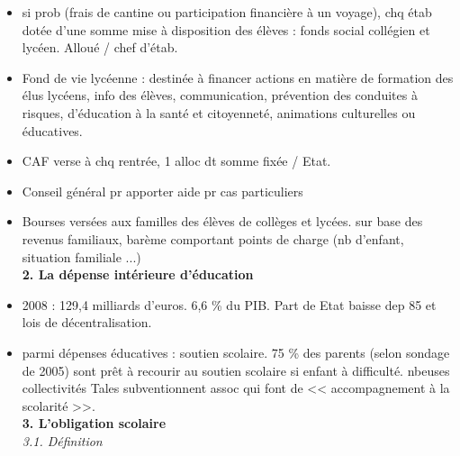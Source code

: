 \documentclass[12pt]{report}
\begin{document}
\begin{itemize}
\vspace{0.5cm}

\item si prob (frais de cantine ou participation financière à un voyage), chq étab dotée d'une somme mise à disposition des élèves : fonds social collégien et lycéen. Alloué /  chef d'étab.\\

\item Fond de vie lycéenne : destinée à financer actions en matière de formation des élus lycéens, info des élèves, communication, prévention des conduites à risques, d'éducation à la santé et citoyenneté, animations culturelles ou éducatives.\\

\item CAF verse à chq rentrée, 1 alloc dt somme fixée / Etat. \\

\item Conseil général pr apporter aide pr cas particuliers \\

\item Bourses versées aux familles des élèves de collèges et lycées. sur base des revenus familiaux, barème comportant points de charge (nb d'enfant, situation familiale ...) \\

\textbf{2. La dépense intérieure d'éducation} \\

\item 2008 : 129,4 milliards d'euros. 6,6 \% du PIB. Part de Etat baisse dep 85 et lois de décentralisation. \\

\item parmi dépenses éducatives : soutien scolaire. 75 \% des parents (selon sondage de 2005) sont prêt à recourir au soutien scolaire si enfant à difficulté. nbeuses collectivités Tales subventionnent assoc qui font de << accompagnement à la scolarité >>. \\

\textbf{3. L'obligation scolaire} \\

\textit{3.1. Définition} \\

\end{itemize}
\end{document}
